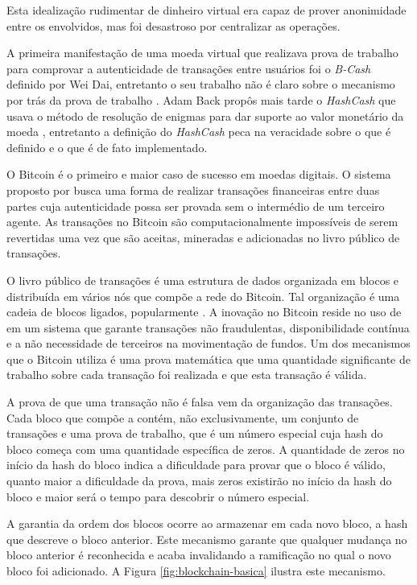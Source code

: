 \documentclass[tcc,capa]{texufpel}
\begin{document}
	Esta idealização rudimentar de dinheiro virtual era capaz de prover anonimidade entre os envolvidos, mas foi desastroso por centralizar as operações.
	
	A primeira manifestação de uma moeda virtual que realizava prova de trabalho para comprovar a autenticidade de transações entre usuários foi o \textit{B-Cash} definido por Wei Dai, entretanto o seu trabalho não é claro sobre o mecanismo por trás da prova de trabalho \cite{buterin2014next}. Adam Back propôs mais tarde o \textit{HashCash} que usava o método de resolução de enigmas para dar suporte ao valor monetário da moeda \cite{back2002hashcash}, entretanto a definição do \textit{HashCash} peca na veracidade sobre o que é definido e o que é de fato implementado.
	
	O Bitcoin é o primeiro e maior caso de sucesso em moedas digitais. O sistema proposto por \cite{nakamoto2008bitcoin} busca uma forma de realizar transações financeiras entre duas partes cuja autenticidade possa ser provada sem o intermédio de um terceiro agente. As transações no Bitcoin são computacionalmente impossíveis de serem revertidas uma vez que são aceitas, mineradas e adicionadas no livro público de transações.
	
	O livro público de transações é uma estrutura de dados organizada em blocos e distribuída em vários nós que compõe a rede do Bitcoin. Tal organização é uma cadeia de blocos ligados, popularmente \bchain. A inovação no Bitcoin reside no uso de \bchain em um sistema que garante transações não fraudulentas, disponibilidade contínua e a não necessidade de terceiros na movimentação de fundos. Um dos mecanismos que o Bitcoin utiliza é uma prova matemática que uma quantidade significante de trabalho sobre cada transação foi realizada e que esta transação é válida. 
	
	A prova de que uma transação não é falsa vem da organização das transações. Cada bloco que compõe a \bchain contém, não exclusivamente, um conjunto de transações e uma prova de trabalho, que é um número especial cuja hash do bloco começa com uma quantidade específica de zeros. A quantidade de zeros no início da hash do bloco indica a dificuldade para provar que o bloco é válido, quanto maior a dificuldade da prova, mais zeros existirão no início da hash do bloco e maior será o tempo para descobrir o número especial.
	
	A garantia da ordem dos blocos ocorre ao armazenar em cada novo bloco, a hash que descreve o bloco anterior. Este mecanismo garante que qualquer mudança no bloco anterior é reconhecida e acaba invalidando a ramificação no qual o novo bloco foi adicionado. A Figura \ref{fig:blockchain-basica} ilustra este mecanismo.
	
\end{document}
